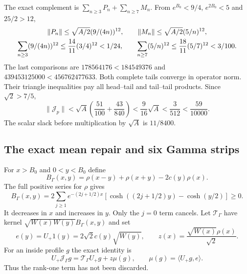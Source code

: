 \documentclass[11pt,a4paper]{article}
\numberwithin{equation}{section}
\theoremstyle{definition}\newtheorem{definition}[theorem]{Definition}
\theoremstyle{remark}\newtheorem{remark}[theorem]{Remark}
\newcommand{\ip}[2]{\langle#1,#2\rangle}\newcommand{\norm}[1]{\lVert#1\rVert}\newcommand{\abs}[1]{\lvert#1\rvert}
\begin{document}
The exact complement is $\sum_{n\ge3}P_n+\sum_{n\ge7}M_n$.
From $e^{B_0}<9/4$, $e^{2{B_0}}<5$ and $25/2>12$,
\begin{gather}
 \norm{P_n}\le\sqrt{A/2}(9/(4n))^{12},\qquad
 \norm{M_n}\le\sqrt{A/2}(5/n)^{12},\notag\\
 \sum_{n\ge3}(9/(4n))^{12}\le\frac{14}{11}(3/4)^{12}<1/24,\qquad
 \sum_{n\ge7}(5/n)^{12}\le\frac{18}{11}(5/7)^{12}<3/100.\label{c:eq:bothtails}
\end{gather}
The last comparisons are $178564176<184549376$ and
$439453125000<456762477633$. Both complete tails converge in operator norm.
Their triangle inequalities pay all head--tail and tail--tail products.
Since $\sqrt2>7/5$,
\begin{equation}\label{c:eq:weightedprimenorm}
 \norm{\mathcal J_p}<\sqrt A\left(\frac{51}{100}+\frac{43}{840}\right)
 <\frac9{16}\sqrt A<\frac3{512}<\frac{59}{10000}.
\end{equation}
The scalar slack before multiplication by $\sqrt A$ is $11/8400$.

\subsection{The exact mean repair and six Gamma strips}\label{c:sec:meanrepair}
For $x>{B_0}$ and $0<y<{B_0}$ define
\begin{equation}\label{c:eq:remainderkernel}
 B_\Gamma(x,y)=\rho(x-y)+\rho(x+y)-2c(y)\rho(x).
\end{equation}
The full positive series for $\rho$ gives
\[
 B_\Gamma(x,y)=2\sum_{j\ge1}e^{-(2j+1/2)x}
 [\cosh((2j+1/2)y)-\cosh(y/2)]\ge0.
\]
It decreases in $x$ and increases in $y$. Only the $j=0$ term cancels.
Let $\mathcal T_\Gamma$ have kernel $\sqrt{W(x)W(y)}B_\Gamma(x,y)$ and set
\[
 e(y)=U_+ 1(y)=2\sqrt2c(y)\sqrt{W(y)},\qquad
 z(x)=\frac{\sqrt{W(x)}\rho(x)}{\sqrt2}.
\]
For an inside profile $g$ the exact identity is
\begin{equation}\label{c:eq:rankrepair}
 U_+ \mathcal J_\Gamma g=\mathcal T_\Gamma U_+ g+z\mu(g),\qquad
 \mu(g)=\ip{U_+ g}{e}.
\end{equation}
Thus the rank-one term has not been discarded.
\end{document}
